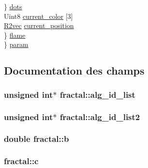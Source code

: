 \begin{DoxyCompactItemize}
\begin{tabbing}
\>\>\} \hyperlink{structfractal_a6f7fe414337c558f2e1777893e2151b6}{dots}\\
\>\>Uint8 \hyperlink{structfractal_ab39f039db5c5ec9e5065093683f39a36}{current\_color} \mbox{[}3\mbox{]}\\
\>\>\hyperlink{structR2vec}{R2vec} \hyperlink{structfractal_a70078b8c8918be78879323adf35e36c4}{current\_position}\\
\>\} \hyperlink{structfractal_a0429a28ac6af0cba0dace7328b2116d6}{flame}\\
\} \hyperlink{structfractal_aaf3b25a8725d05106ece6bc318fb8620}{param}\\

\end{tabbing}\end{DoxyCompactItemize}


\subsection{\-Documentation des champs}
\hypertarget{structfractal_aa05f91d00df1a44d26b3202e31f92f7d}{
\subsubsection[{alg\-\_\-id\-\_\-list}]{\setlength{\rightskip}{0pt plus 5cm}unsigned int$\ast$ {\bf fractal\-::alg\-\_\-id\-\_\-list}}}\label{structfractal_aa05f91d00df1a44d26b3202e31f92f7d}
\hypertarget{structfractal_a05967489e9dede83bae6bae463eaec7b}{
\subsubsection[{alg\-\_\-id\-\_\-list2}]{\setlength{\rightskip}{0pt plus 5cm}unsigned int$\ast$ {\bf fractal\-::alg\-\_\-id\-\_\-list2}}}\label{structfractal_a05967489e9dede83bae6bae463eaec7b}
\hypertarget{structfractal_a0a85246deca0ebcb11e689009da9aeb0}{
\subsubsection[{b}]{\setlength{\rightskip}{0pt plus 5cm}double {\bf fractal\-::b}}}\label{structfractal_a0a85246deca0ebcb11e689009da9aeb0}
\hypertarget{structfractal_ae5d135f6f99883eba1e2fea9047791f6}{
\subsubsection[{c}]{ {\bf fractal\-::c}}}\label{structfractal_ae5d135f6f99883eba1e2fea9047791f6}
